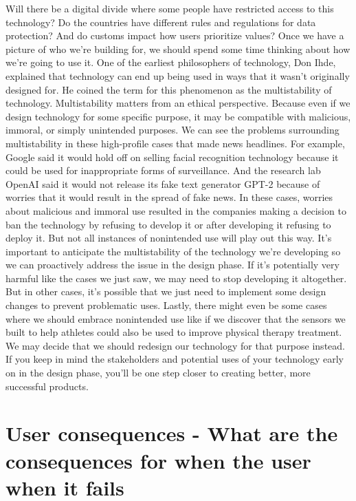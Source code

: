 Will there be a digital divide where some people have restricted access
to this technology?
Do the countries have different rules and regulations for data protection?
And do customs impact how users prioritize values?
Once we have a picture of who we're building for,
we should spend some time thinking about how we're going to use it.
One of the earliest philosophers of technology, Don Ihde,
explained that technology can end up being used in ways that it
wasn't originally designed for.
He coined the term for this phenomenon as the multistability of technology.
Multistability matters from an ethical perspective.
Because even if we design technology for some specific purpose,
it may be compatible with malicious, immoral, or simply unintended purposes.
We can see the problems surrounding multistability
in these high-profile cases that made news headlines.
For example, Google said it would hold off
on selling facial recognition technology because it
could be used for inappropriate forms of surveillance.
And the research lab OpenAI said it would not
release its fake text generator GPT-2 because of worries
that it would result in the spread of fake news.
In these cases, worries about malicious and immoral use
resulted in the companies making a decision
to ban the technology by refusing to develop it
or after developing it refusing to deploy it.
But not all instances of nonintended use will play out this way.
It's important to anticipate the multistability of the technology we're
developing so we can proactively address the issue in the design phase.
If it's potentially very harmful like the cases we just saw,
we may need to stop developing it altogether.
But in other cases, it's possible that we just
need to implement some design changes to prevent problematic uses.
Lastly, there might even be some cases where
we should embrace nonintended use like if we discover
that the sensors we built to help athletes
could also be used to improve physical therapy treatment.
We may decide that we should redesign our technology for that purpose
instead.
If you keep in mind the stakeholders and potential uses of your technology
early on in the design phase, you'll be one step closer
to creating better, more successful products.


\section{User consequences - What are the consequences for when the user when it fails}


